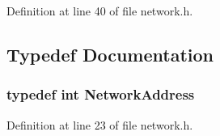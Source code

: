 Definition at line 40 of file network.\+h.



\subsection{Typedef Documentation}
\subsubsection[{Network\+Address}]{\setlength{\rightskip}{0pt plus 5cm}typedef int {\bf Network\+Address}}\label{network_8h_a5f46a8b9223b0d95abfe3f8f39bc4e39}


Definition at line 23 of file network.\+h.

